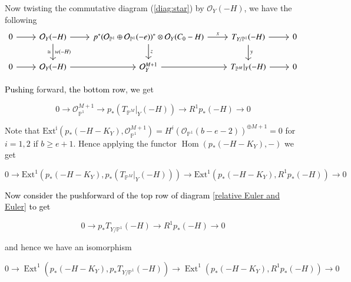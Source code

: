 \documentclass[11pt,twoside]{amsart}
\theoremstyle{plain}
\numberwithin{equation}{section}
\theoremstyle{definition}
\begin{document}
\color{black}

Now twisting the commutative diagram (\ref{diag:star}) by $\mathcal{O}_Y(-H)$, we have the following
\begin{equation}
\begin{tikzcd}\label{relative Euler and Euler}
  0 \arrow[r] & \mathcal{O}_Y(-H) \arrow[r] \arrow[d, "w(-H)", "\cong"'] & p^*(\mathcal{O}_{\mathbb{P}^1} \oplus \mathcal{O}_{\mathbb{P}^1}(-e))^* \otimes \mathcal{O}_Y(C_0-H) \arrow[r, "x"] \arrow[d, "z"] & T_{Y/\mathbb{P}^1}(-H) \arrow[r] \arrow[d, "y"] & 0 \\
   0 \arrow[r] & \mathcal{O}_Y(-H) \arrow[r] & \mathcal{O}_Y^{M+1} \arrow[r] & T_{\mathbb{P}^M}|_Y(-H) \arrow[r] & 0
\end{tikzcd}
\end{equation}
\color{black}
 
\textcolor{black}{Pushing} forward, \textcolor{black}{the bottom row}, \textcolor{black}{we} get 

 \begin{equation}\label{25}
     0 \to \mathcal{O}_{\mathbb{P}^1}^{M+1} \to p_*(T_{\mathbb{P}^M}|_Y(-H)) \to R^1p_*(-H) \to 0
 \end{equation}

Note that $\operatorname{Ext^i}(p_*(-H-K_Y),  \mathcal{O}_{\mathbb{P}^1}^{M+1}) = H^i(\mathcal{O}_{\mathbb{P}^1}(b-e-2))^{\oplus M+1} = 0$ for $i = 1,2$ if $b \geq e+1$. Hence applying the functor $\operatorname{Hom}(p_*(-H-K_Y), -)$ we get 

\begin{equation}\label{26}
     0 \to \operatorname{Ext^1}(p_*(-H-K_Y), 
 p_*(T_{\mathbb{P}^M}|_Y(-H))) \to \operatorname{Ext^1}(p_*(-H-K_Y), 
 R^1p_*(-H)) \to 0
 \end{equation}










\textcolor{black}{Now consider the pushforward of the top row of diagram \ref{relative Euler and Euler} to get} 

\begin{equation}\label{29}
 0 \to p_*T_{Y/\mathbb{P}^1}(-H) \to R^1p_*(-H) \to 0 
\end{equation}

\color{black}
and hence we have an isomorphism 

\begin{equation}\label{top hor}
 0 \to \operatorname{Ext}^1(p_*(-H-K_Y), p_*T_{Y/\mathbb{P}^1}(-H)) \to \operatorname{Ext}^1(p_*(-H-K_Y), R^1p_*(-H)) \to 0 
\end{equation}
\end{document}
